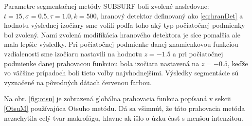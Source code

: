 \documentclass[a4paper,11pt,oneside]{article}%
\begin{document}
Parametre segmentačnej metódy SUBSURF boli zvolené nasledovne:
$t = 15, \sigma = 0.5, \tau = 1.0, k = 500$, hranový detektor definovaný ako \ref{eq:hranDet} a hodnotu výslednej izočiary sme volili podľa toho aký typ počiatočnej podmienky bol zvolený. Nami zvolená modifikácia hranového detektora je síce pomalšia ale mala lepšie výsledky. Pri počiatočnej podmienke danej znamienkovou funkciou vzdialenosti sme izočiaru nastavili na hodnotu $z = -1.5$ a pri počiatočnej podmienke danej prahovacou funkciou bola izočiara nastavená na $z = -0.5$, keďže vo väčšine prípadoch boli tieto voľby najvhodnejšími. Výsledky segmentácie sú vyznačené na pôvodných dátach červenou farbou. 


Na obr. \ref{fig:otsu} je zobrazená globálna prahovacia funkcia popísaná v sekcii \ref{OtsuM} používajúca Otsuho metódu. Dá sa všimnúť, že táto prahovacia metóda nezachytila celý tvar makrofágu, hlavne ak išlo o úzku časť s menšou intenzitou.
\end{document}

